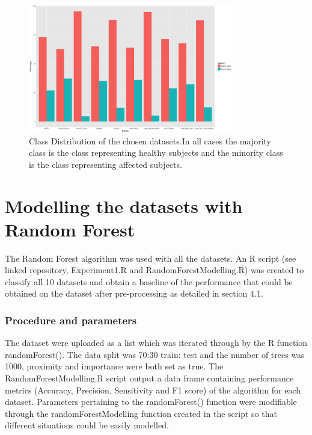 \begin{figure}[H]
    \centering
    \includegraphics[width=0.8\textwidth]{ThesisTemplate/usingLatex/chapter4Images/figure4_1b.png}
    \caption{Class Distribution of the chosen datasets.\newline In all cases the majority class is the class representing healthy subjects and the minority class is the class representing affected subjects.}
    \label{fig:my_label}
\end{figure}


\section{Modelling the datasets with Random Forest}
The Random Forest algorithm was used with all the datasets. 
An R script (see linked repository, Experiment1.R and RandomForestModelling.R) was created to classify all 10 datasets and obtain a baseline of the performance that could be obtained on the dataset after pre-processing as detailed in section 4.1.
\subsubsection{Procedure and parameters}
The dataset were uploaded as a list which was iterated through by the R function randomForest(). 
The data split was 70:30 train: test and the number of trees was 1000, proximity and importance were both set as true.\newline
The RandomForestModelling.R script output  a data frame containing performance metrics (Accuracy, Precision, Sensitivity and F1 score) of the algorithm for each dataset.\newline
Parameters pertaining to the randomForest() function were modifiable through the randomForestModelling function created in the script so that different situations could be easily modelled.


